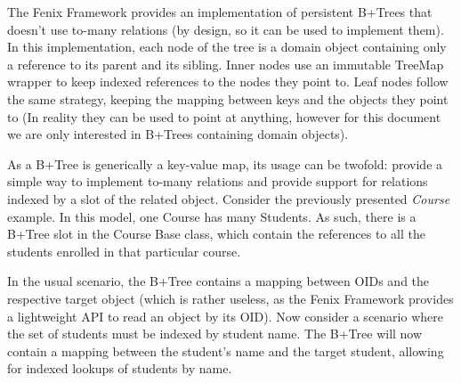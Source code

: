 The Fenix Framework provides an implementation of persistent B+Trees
that doesn't use to-many relations (by design, so it can be used to
implement them). In this implementation, each node of the tree is a
domain object containing only a reference to its parent and its
sibling. Inner nodes use an immutable TreeMap wrapper to keep indexed
references to the nodes they point to. Leaf nodes follow the same
strategy, keeping the mapping between keys and the objects they point
to (In reality they can be used to point at anything, however for this
document we are only interested in B+Trees containing domain objects).

As a B+Tree is generically a key-value map, its usage can be twofold:
provide a simple way to implement to-many relations and provide
support for relations indexed by a slot of the related
object. Consider the previously presented {\it Course} example. In
this model, one Course has many Students. As such, there is a B+Tree
slot in the Course Base class, which contain the references to all the
students enrolled in that particular course.

In the usual scenario, the B+Tree contains a mapping between OIDs and
the respective target object (which is rather useless, as the Fenix
Framework provides a lightweight API to read an object by its OID).
Now consider a scenario where the set of students must be indexed by
student name. The B+Tree will now contain a mapping between the
student's name and the target student, allowing for indexed lookups of
students by name.


